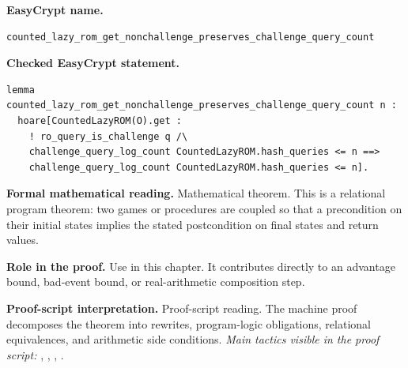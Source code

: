 \begin{formaltheorem}
\noindent\textbf{EasyCrypt name.}
\begin{lstlisting}[language=EasyCrypt,basicstyle=\ttfamily\scriptsize]
counted_lazy_rom_get_nonchallenge_preserves_challenge_query_count
\end{lstlisting}
\noindent\textbf{Checked EasyCrypt statement.}
\begin{lstlisting}[language=EasyCrypt,basicstyle=\ttfamily\scriptsize]
lemma counted_lazy_rom_get_nonchallenge_preserves_challenge_query_count n :
  hoare[CountedLazyROM(O).get :
    ! ro_query_is_challenge q /\
    challenge_query_log_count CountedLazyROM.hash_queries <= n ==>
    challenge_query_log_count CountedLazyROM.hash_queries <= n].
\end{lstlisting}
\noindent\textbf{Formal mathematical reading.}
Mathematical theorem. This is a relational program theorem: two games or procedures are coupled so that a precondition on their initial states implies the stated postcondition on final states and return values.

\noindent\textbf{Role in the proof.}
Use in this chapter. It contributes directly to an advantage bound, bad-event bound, or real-arithmetic composition step.

\noindent\textbf{Proof-script interpretation.}
Proof-script reading. The machine proof decomposes the theorem into rewrites, program-logic obligations, relational equivalences, and arithmetic side conditions.
\emph{Main tactics visible in the proof script:} \ec{proc}, \ec{wp}, \ec{call}, \ec{smt}.

\end{formaltheorem}

